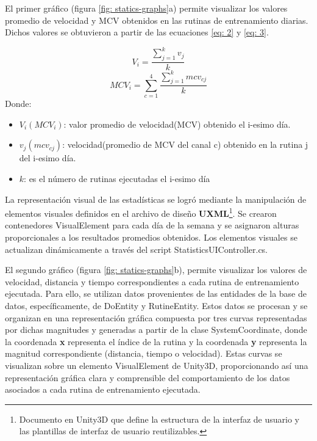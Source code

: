El primer gráfico (figura \ref{fig: statics-graphs}a) permite visualizar los valores promedio de velocidad y MCV
obtenidos en las rutinas de entrenamiento diarias. Dichos valores se obtuvieron a partir de las ecuaciones \ref{eq: 2} y \ref{eq: 3}.    

\begin{equation}
    V_{i} = \frac{\sum_{j=1}^{k} v_{j}}{k}
    \label{eq: 2}
    \end{equation}
    \begin{equation}
    MCV_{i} = \sum_{c=1}^{4}\frac{\sum_{j=1}^{k} mcv_{c j}}{k}
    \label{eq: 3}
\end{equation}
Donde:
\begin{itemize}
    \item $V_{i} (MCV_{i})$: valor promedio de velocidad(MCV) obtenido el i-esimo día.
    \item $v_{j}(mcv_{cj})$: velocidad(promedio de MCV del canal c) obtenido en la rutina j del i-esimo día. 
    \item $k$: es el número de rutinas ejecutadas el i-esimo día 
\end{itemize}
La representación visual de las estadísticas se logró mediante la manipulación de elementos visuales definidos en el archivo de diseño \textbf{UXML}\footnote{Documento en Unity3D que define la estructura de la interfaz de usuario y las plantillas de interfaz de usuario reutilizables.}. Se crearon contenedores VisualElement para cada día de la semana y se asignaron alturas proporcionales a los resultados promedios obtenidos. Los elementos visuales se actualizan dinámicamente a través del script StatisticsUIController.cs.

El segundo gráfico (figura \ref{fig: statics-graphs}b), permite visualizar los valores de velocidad, distancia y tiempo 
correspondientes a cada rutina de entrenamiento ejecutada. Para ello, se utilizan datos provenientes de las entidades 
de la base de datos, específicamente, de DoEntity y RutineEntity. Estos datos se procesan y se organizan en una representación gráfica compuesta por tres curvas representadas por dichas magnitudes y generadas a partir de la clase SystemCoordinate, donde la coordenada \textbf{x} representa el índice de la rutina y la coordenada \textbf{y} representa la magnitud correspondiente (distancia, tiempo o velocidad). Estas curvas  se visualizan sobre un elemento VisualElement de Unity3D, proporcionando así una representación gráfica clara y comprensible del comportamiento de los datos asociados a cada rutina de entrenamiento ejecutada.
    


